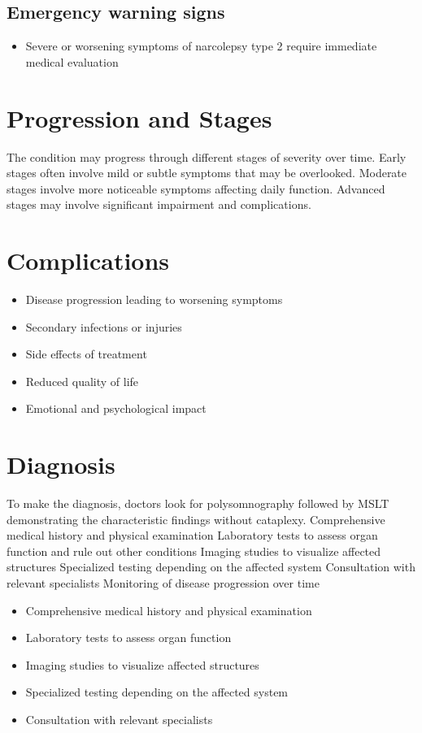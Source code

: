 \subsection{Emergency warning signs}
\begin{itemize}[noitemsep]
  \item Severe or worsening symptoms of narcolepsy type 2 require immediate medical evaluation
\end{itemize}
\section{Progression and Stages}
The condition may progress through different stages of severity over time. Early stages often involve mild or subtle symptoms that may be overlooked. Moderate stages involve more noticeable symptoms affecting daily function. Advanced stages may involve significant impairment and complications.
\section{Complications}
\begin{itemize}[noitemsep]
  \item Disease progression leading to worsening symptoms
  \item Secondary infections or injuries
  \item Side effects of treatment
  \item Reduced quality of life
  \item Emotional and psychological impact
\end{itemize}
\section{Diagnosis}
To make the diagnosis, doctors look for polysomnography followed by MSLT demonstrating the characteristic findings without cataplexy. Comprehensive medical history and physical examination Laboratory tests to assess organ function and rule out other conditions Imaging studies to visualize affected structures Specialized testing depending on the affected system Consultation with relevant specialists Monitoring of disease progression over time

\begin{itemize}[noitemsep]
  \item Comprehensive medical history and physical examination
  \item Laboratory tests to assess organ function
  \item Imaging studies to visualize affected structures
  \item Specialized testing depending on the affected system
  \item Consultation with relevant specialists
\end{itemize}
